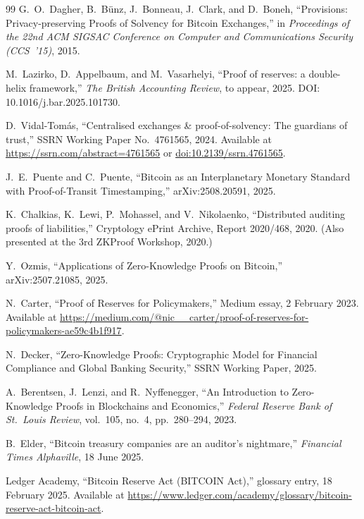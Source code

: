 \documentclass[11pt]{article}
\begin{document}
\begin{thebibliography}{99}
  G.~O.~Dagher, B.~B\"unz, J.~Bonneau, J.~Clark, and D.~Boneh,
  ``Provisions: Privacy-preserving Proofs of Solvency for Bitcoin Exchanges,''
  in \emph{Proceedings of the 22nd ACM SIGSAC Conference on Computer and
  Communications Security (CCS~'15)}, 2015.
  
  M.~Lazirko, D.~Appelbaum, and M.~Vasarhelyi,
  ``Proof of reserves: a double-helix framework,''
  \emph{The British Accounting Review}, to appear, 2025.
  DOI: 10.1016/j.bar.2025.101730.
  
  D.~Vidal-Tom\'as,
  ``Centralised exchanges \& proof-of-solvency: The guardians of trust,''
  SSRN Working Paper No.~4761565, 2024.
  Available at \url{https://ssrn.com/abstract=4761565} or
  \href{http://dx.doi.org/10.2139/ssrn.4761565}{doi:10.2139/ssrn.4761565}.
  
  J.~E.~Puente and C.~Puente,
  ``Bitcoin as an Interplanetary Monetary Standard with Proof-of-Transit Timestamping,''
  arXiv:2508.20591, 2025.
  
  K.~Chalkias, K.~Lewi, P.~Mohassel, and V.~Nikolaenko,
  ``Distributed auditing proofs of liabilities,''
  Cryptology ePrint Archive, Report 2020/468, 2020.
  (Also presented at the 3rd ZKProof Workshop, 2020.)
  
  Y.~Ozmis,
  ``Applications of Zero-Knowledge Proofs on Bitcoin,''
  arXiv:2507.21085, 2025.
  
  N.~Carter,
  ``Proof of Reserves for Policymakers,''
  Medium essay, 2 February 2023.
  Available at
  \url{https://medium.com/@nic__carter/proof-of-reserves-for-policymakers-ae59c4b1f917}.
  
  N.~Decker,
  ``Zero-Knowledge Proofs: Cryptographic Model for Financial Compliance
  and Global Banking Security,''
  SSRN Working Paper, 2025.
  
  A.~Berentsen, J.~Lenzi, and R.~Nyffenegger,
  ``An Introduction to Zero-Knowledge Proofs in Blockchains and Economics,''
  \emph{Federal Reserve Bank of St.~Louis Review}, vol.~105, no.~4,
  pp.~280--294, 2023.
  
  B.~Elder,
  ``Bitcoin treasury companies are an auditor's nightmare,''
  \emph{Financial Times Alphaville}, 18 June 2025.
  
  Ledger Academy,
  ``Bitcoin Reserve Act (BITCOIN Act),''
  glossary entry, 18 February 2025.
  Available at
  \url{https://www.ledger.com/academy/glossary/bitcoin-reserve-act-bitcoin-act}.
  

\end{thebibliography}
\end{document}
